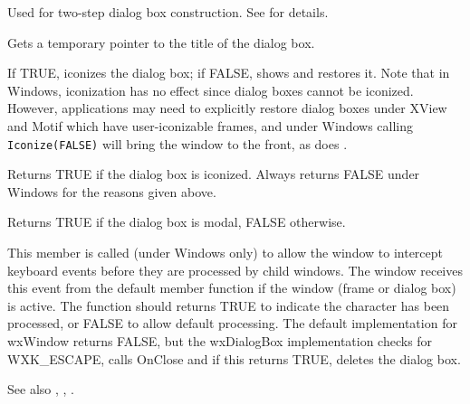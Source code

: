 Used for two-step dialog box construction. See \rtfsp
for details.



Gets a temporary pointer to the title of the dialog box.



If TRUE, iconizes the dialog box; if FALSE, shows and restores it. Note
that in Windows, iconization has no effect since dialog boxes cannot be
iconized. However, applications may need to explicitly restore dialog
boxes under XView and Motif which have user-iconizable frames, and under Windows
calling {\tt Iconize(FALSE)} will bring the window to the front, as does
.



Returns TRUE if the dialog box is iconized. Always returns FALSE under
Windows for the reasons given above.



Returns TRUE if the dialog box is modal, FALSE otherwise.

\label{wxdialogboxoncharhook}


This member is called (under Windows only) to allow the window to intercept keyboard events
before they are processed by child windows. The window receives this event from
the default  member function if the window
(frame or dialog box) is active. The function should returns TRUE to indicate the
character has been processed, or FALSE to allow default processing. The default
implementation for wxWindow returns FALSE, but the wxDialogBox implementation
checks for WXK\_ESCAPE, calls OnClose and if this returns TRUE, deletes the dialog box.

See also , ,\rtfsp
{}.


